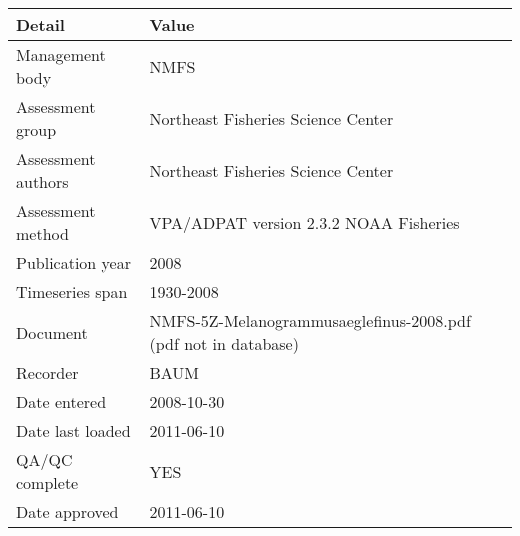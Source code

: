 \begin{table}[htb]
\centering
\begin{tabular}{lp{7cm}}
\toprule
Detail & Value \\
\midrule
Management body    & NMFS                                                           \\
Assessment group   & Northeast Fisheries Science Center                             \\
Assessment authors & Northeast Fisheries Science Center                             \\
Assessment method  & VPA/ADPAT version 2.3.2 NOAA Fisheries                         \\
Publication year   & 2008                                                           \\
Timeseries span    & 1930-2008                                                      \\
Document           & NMFS-5Z-Melanogrammusaeglefinus-2008.pdf (pdf not in database) \\
Recorder           & BAUM                                                           \\
Date entered       & 2008-10-30                                                     \\
Date last loaded   & 2011-06-10                                                     \\
QA/QC complete     & YES                                                            \\
Date approved      & 2011-06-10                                                     \\
\bottomrule
\end{tabular}
\label{tab:assessdet}
\end{table}
